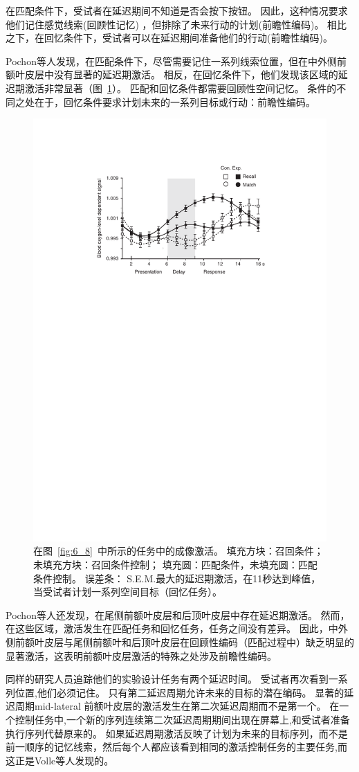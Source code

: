 在匹配条件下，受试者在延迟期间不知道是否会按下按钮。
因此，这种情况要求他们记住感觉线索(回顾性记忆) ，但排除了未来行动的计划(前瞻性编码)。
相比之下，在回忆条件下，受试者可以在延迟期间准备他们的行动(前瞻性编码)。


Pochon等人发现，在匹配条件下，尽管需要记住一系列线索位置，但在中外侧前额叶皮层中没有显著的延迟期激活。
相反，在回忆条件下，他们发现该区域的延迟期激活非常显著（图~\ref{fig:6_9}）。
匹配和回忆条件都需要回顾性空间记忆。
条件的不同之处在于，回忆条件要求计划未来的一系列目标或行动：前瞻性编码。


\begin{figure}
	\centering
	\includegraphics[width=0.6\linewidth]{chap6/6_9}
	\caption{在图~\ref{fig:6_8}~中所示的任务中的成像激活。
		填充方块：召回条件；未填充方块：召回条件控制；
		填充圆：匹配条件，未填充圆：匹配条件控制。
		误差条： S.E.M.最大的延迟期激活，在11秒达到峰值，当受试者计划一系列空间目标（回忆任务）\cite{pochon2001role}。}
	\label{fig:6_9}
\end{figure}


Pochon等人还发现，在尾侧前额叶皮层和后顶叶皮层中存在延迟期激活。
然而，在这些区域，激活发生在匹配任务和回忆任务，任务之间没有差异。
因此，中外侧前额叶皮层与尾侧前额叶和后顶叶皮层在回顾性编码（匹配过程中）缺乏明显的显著激活，这表明前额叶皮层激活的特殊之处涉及前瞻性编码。


同样的研究人员追踪他们的实验设计任务有两个延迟时间\cite{volle2005specific}。
受试者再次看到一系列位置,他们必须记住。
只有第二延迟周期允许未来的目标的潜在编码。
显著的延迟周期mid-lateral 前额叶皮层的激活发生在第二次延迟周期而不是第一个。
在一个控制任务中,一个新的序列连续第二次延迟周期期间出现在屏幕上,和受试者准备执行序列代替原来的。
如果延迟周期激活反映了计划为未来的目标序列，而不是前一顺序的记忆线索，然后每个人都应该看到相同的激活控制任务的主要任务,而这正是Volle等人发现的。


